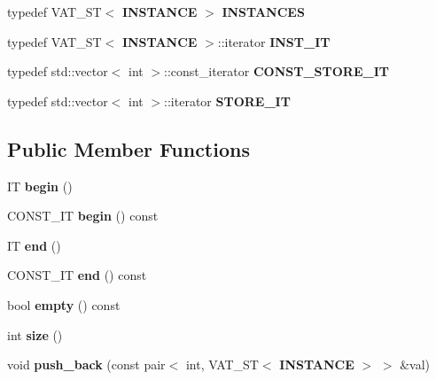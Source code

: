 \begin{CompactItemize}
\item 
typedef VAT\_\-ST$<$ {\bf INSTANCE} $>$ {\bf INSTANCES}\label{classvat_3_01TREE__PROP_00_01V__Fkk__EMB__MINE__PROP_00_01VAT__ST_01_4_w7}

\item 
typedef VAT\_\-ST$<$ {\bf INSTANCE} $>$::iterator {\bf INST\_\-IT}\label{classvat_3_01TREE__PROP_00_01V__Fkk__EMB__MINE__PROP_00_01VAT__ST_01_4_w8}

\item 
typedef std::vector$<$ int $>$::const\_\-iterator {\bf CONST\_\-STORE\_\-IT}\label{classvat_3_01TREE__PROP_00_01V__Fkk__EMB__MINE__PROP_00_01VAT__ST_01_4_w9}

\item 
typedef std::vector$<$ int $>$::iterator {\bf STORE\_\-IT}\label{classvat_3_01TREE__PROP_00_01V__Fkk__EMB__MINE__PROP_00_01VAT__ST_01_4_w10}

\end{CompactItemize}
\subsection*{Public Member Functions}
\begin{CompactItemize}
\item 
IT {\bf begin} ()\label{classvat_3_01TREE__PROP_00_01V__Fkk__EMB__MINE__PROP_00_01VAT__ST_01_4_a0}

\item 
CONST\_\-IT {\bf begin} () const \label{classvat_3_01TREE__PROP_00_01V__Fkk__EMB__MINE__PROP_00_01VAT__ST_01_4_a1}

\item 
IT {\bf end} ()\label{classvat_3_01TREE__PROP_00_01V__Fkk__EMB__MINE__PROP_00_01VAT__ST_01_4_a2}

\item 
CONST\_\-IT {\bf end} () const \label{classvat_3_01TREE__PROP_00_01V__Fkk__EMB__MINE__PROP_00_01VAT__ST_01_4_a3}

\item 
bool {\bf empty} () const \label{classvat_3_01TREE__PROP_00_01V__Fkk__EMB__MINE__PROP_00_01VAT__ST_01_4_a4}

\item 
int {\bf size} ()\label{classvat_3_01TREE__PROP_00_01V__Fkk__EMB__MINE__PROP_00_01VAT__ST_01_4_a5}

\item 
void {\bf push\_\-back} (const  pair$<$ int, VAT\_\-ST$<$ {\bf INSTANCE} $>$ $>$ \&val)
\end{CompactItemize}
